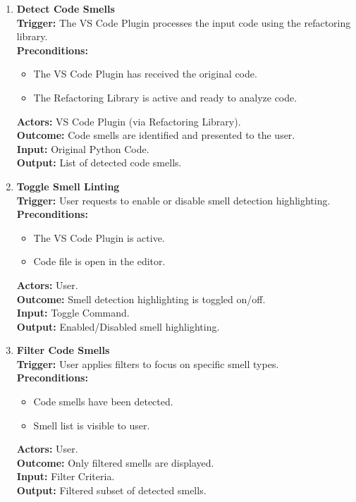 \documentclass[12pt]{article}
\begin{document}
\setlength{\parindent}{0pt}
\begin{enumerate}[label={\bf PUC \arabic*:}, wide=0pt, font=\itshape]

  \item \textbf{Detect Code Smells} \\[2mm]
    \textbf{Trigger:} The VS Code Plugin processes the input code using the refactoring library. \\[2mm]
    \textbf{Preconditions:}
    \begin{itemize}
      \item The VS Code Plugin has received the original code.
      \item The Refactoring Library is active and ready to analyze code.
    \end{itemize}
    \textbf{Actors:} VS Code Plugin (via Refactoring Library). \\
    \textbf{Outcome:} Code smells are identified and presented to the user. \\
    \textbf{Input:} Original Python Code. \\
    \textbf{Output:} List of detected code smells.

  \item \textbf{Toggle Smell Linting} \\[2mm]
    \textbf{Trigger:} User requests to enable or disable smell detection highlighting. \\[2mm]
    \textbf{Preconditions:}
    \begin{itemize}
      \item The VS Code Plugin is active.
      \item Code file is open in the editor.
    \end{itemize}
    \textbf{Actors:} User. \\
    \textbf{Outcome:} Smell detection highlighting is toggled on/off. \\
    \textbf{Input:} Toggle Command. \\
    \textbf{Output:} Enabled/Disabled smell highlighting.

  \item \textbf{Filter Code Smells} \\[2mm]
    \textbf{Trigger:} User applies filters to focus on specific smell types. \\[2mm]
    \textbf{Preconditions:}
    \begin{itemize}
      \item Code smells have been detected.
      \item Smell list is visible to user.
    \end{itemize}
    \textbf{Actors:} User. \\
    \textbf{Outcome:} Only filtered smells are displayed. \\
    \textbf{Input:} Filter Criteria. \\
    \textbf{Output:} Filtered subset of detected smells.


\end{enumerate}
\end{document}
